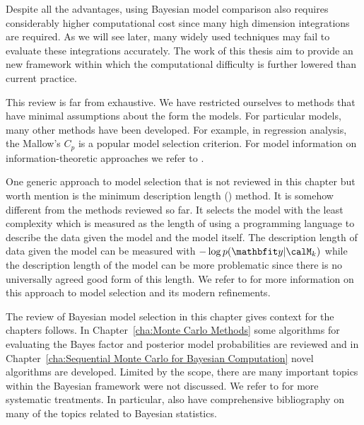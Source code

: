 Despite all the advantages, using Bayesian model comparison also requires
considerably higher computational cost since many high dimension integrations
are required. As we will see later, many widely used techniques may fail to
evaluate these integrations accurately. The work of this thesis aim to provide
an new framework within which the computational difficulty is further lowered
than current practice.

This review is far from exhaustive. We have restricted ourselves to methods
that have minimal assumptions about the form the models. For particular
models, many other methods have been developed. For example, in regression
analysis, the Mallow's $C_p$ is a popular model selection criterion. For model
information on information-theoretic approaches we refer to
\cite{Burnham:2002wc,Claeskens:2008tq}.

One generic approach to model selection that is not reviewed in this chapter
but worth mention is the minimum description length (\mdl) method. It is
somehow different from the methods reviewed so far. It selects the model with
the least complexity which is measured as the length of using a programming
language to describe the data given the model and the model itself. The
description length of data given the model can be measured with $-\log
p(\data|\calM_k)$ while the description length of the model can be more
problematic since there is no universally agreed good form of this length. We
refer to \cite{Grunwald:2005vx} for more information on this approach to model
selection and its modern refinements.

The review of Bayesian model selection in this chapter gives context for the
chapters follows. In Chapter~\ref{cha:Monte Carlo Methods} some algorithms for
evaluating the Bayes factor and posterior model probabilities are reviewed and
in Chapter~\ref{cha:Sequential Monte Carlo for Bayesian Computation} novel
algorithms are developed. Limited by the scope, there are many important
topics within the Bayesian framework were not discussed. We refer to
\cite{Bernardo:1994vd,Robert:2007tc} for more systematic treatments. In
particular, \cite{Bernardo:1994vd} also have comprehensive bibliography on
many of the topics related to Bayesian statistics.
